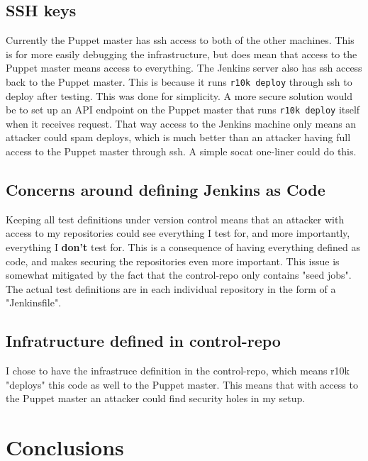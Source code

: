 \subsection{SSH keys}

Currently the Puppet master has ssh access to both of the other machines. This is for more easily debugging the infrastructure, but does mean that access to the Puppet master means access to everything. The Jenkins server also has ssh access back to the Puppet master. This is because it runs \texttt{r10k deploy} through ssh to deploy after testing. This was done for simplicity. A more secure solution would be to set up an API endpoint on the Puppet master that runs \texttt{r10k deploy} itself when it receives request. That way access to the Jenkins machine only means an attacker could spam deploys, which is much better than an attacker having full access to the Puppet master through ssh. A simple socat one-liner \cite{socatwebhook} could do this.

\subsection{Concerns around defining Jenkins as Code}

Keeping all test definitions under version control means that an attacker with access to my repositories could see everything I test for, and more importantly, everything I \textbf{don't} test for. This is a consequence of having everything defined as code, and makes securing the repositories even more important. This issue is somewhat mitigated by the fact that the control-repo only contains "seed jobs". The actual test definitions are in each individual repository in the form of a "Jenkinsfile".

\subsection{Infratructure defined in control-repo}

I chose to have the infrastruce definition in the control-repo, which means r10k "deploys" this code as well to the Puppet master. This means that with access to the Puppet master an attacker could find security holes in my setup. 


\section{Conclusions}

